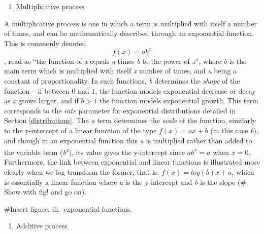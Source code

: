 \documentclass[
  12pt,
]{book}
\providecommand{\tightlist}{%
  \setlength{\itemsep}{0pt}\setlength{\parskip}{0pt}}
\begin{document}
\begin{enumerate}
\def\labelenumi{\arabic{enumi}.}
\tightlist
\item
  Multiplicative process
\end{enumerate}

A multiplicative process is one in which a term is multiplied with itself a number of times, and can be mathematically described through an exponential function. This is commonly denoted \[f(x) = ab^x\], read as ``the function of \emph{x} equals \emph{a} times \emph{b} to the power of \emph{x}'', where \emph{b} is the main term which is multiplied with itself \emph{x} number of times, and \emph{a} being a constant of proportionality. In such functions, \emph{b} determines the \emph{shape} of the function -- if between 0 and 1, the function models exponential decrease or decay as \emph{x} grows larger, and if \(b > 1\) the function models exponential growth. This term corresponds to the \emph{rate} parameter for exponential distributions detailed in Section \ref{distributions}. The \emph{a} term determines the \emph{scale} of the function, similarly to the y-intercept of a linear function of the type \(f(x) = ax+b\) (in this case \emph{b}), and though in an exponential function this \emph{a} is multiplied rather than added to the variable term (\emph{b\textsuperscript{x}}), its value gives the y-intercept since \(ab^x = a\) when \(x = 0\). Furthermore, the link between exponential and linear functions is illustrated more clearly when we log-transform the former, that is: \(f(x) = log(b)x+a\), which is essentially a linear function where \emph{a} is the y-intercept and \emph{b} is the slope (\# Show with fig! and go on).

\#Insert figure, ill.~exponential functions.

\begin{enumerate}
\def\labelenumi{\arabic{enumi}.}
\tightlist
\item
  Additive process
\end{enumerate}
\end{document}
